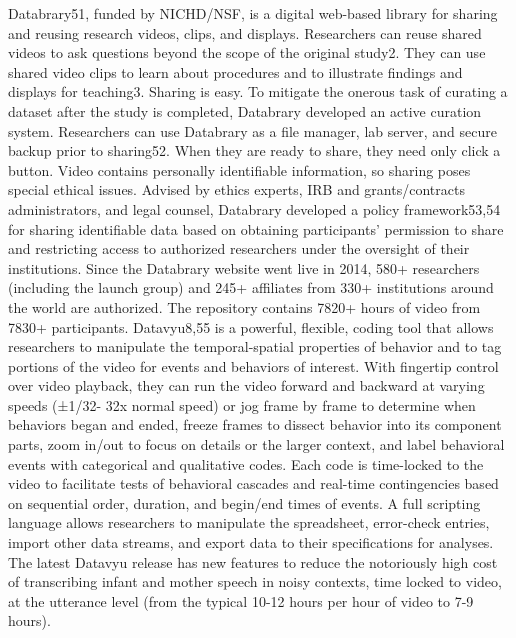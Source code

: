 \documentclass[english,man]{apa6}
\theoremstyle{definition}
\theoremstyle{definition}
\theoremstyle{definition}
\theoremstyle{remark}
\begin{document}
Databrary51, funded by NICHD/NSF, is a digital web-based library for
sharing and reusing research videos, clips, and displays. Researchers
can reuse shared videos to ask questions beyond the scope of the
original study2. They can use shared video clips to learn about
procedures and to illustrate findings and displays for teaching3.
Sharing is easy. To mitigate the onerous task of curating a dataset
after the study is completed, Databrary developed an active curation
system. Researchers can use Databrary as a file manager, lab server, and
secure backup prior to sharing52. When they are ready to share, they
need only click a button. Video contains personally identifiable
information, so sharing poses special ethical issues. Advised by ethics
experts, IRB and grants/contracts administrators, and legal counsel,
Databrary developed a policy framework53,54 for sharing identifiable
data based on obtaining participants' permission to share and
restricting access to authorized researchers under the oversight of
their institutions. Since the Databrary website went live in 2014, 580+
researchers (including the launch group) and 245+ affiliates from 330+
institutions around the world are authorized. The repository contains
7820+ hours of video from 7830+ participants. Datavyu8,55 is a powerful,
flexible, coding tool that allows researchers to manipulate the
temporal-spatial properties of behavior and to tag portions of the video
for events and behaviors of interest. With fingertip control over video
playback, they can run the video forward and backward at varying speeds
(±1/32- 32x normal speed) or jog frame by frame to determine when
behaviors began and ended, freeze frames to dissect behavior into its
component parts, zoom in/out to focus on details or the larger context,
and label behavioral events with categorical and qualitative codes. Each
code is time-locked to the video to facilitate tests of behavioral
cascades and real-time contingencies based on sequential order,
duration, and begin/end times of events. A full scripting language
allows researchers to manipulate the spreadsheet, error-check entries,
import other data streams, and export data to their specifications for
analyses. The latest Datavyu release has new features to reduce the
notoriously high cost of transcribing infant and mother speech in noisy
contexts, time locked to video, at the utterance level (from the typical
10-12 hours per hour of video to 7-9 hours).
\end{document}
